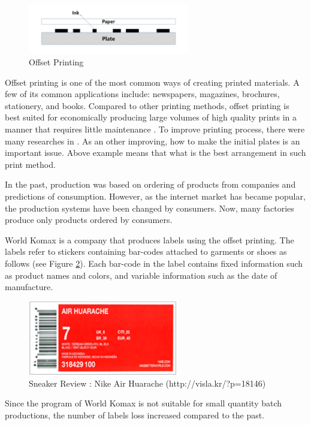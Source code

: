 \begin{figure}[h!]
	\centering
	\includegraphics[width=7cm]{OffsetPrint.pdf}
	\caption{Offset Printing}
	\label{fig:OffsetPrint}
\end{figure}

Offset printing is one of the most common ways of creating printed materials. A few of its common applications include: newspapers, magazines, brochures, stationery, and books. Compared to other printing methods, offset printing is best suited for economically producing large volumes of high quality prints in a manner that requires little maintenance \cite{Kipphan2001}. 
To improve printing process, there were many researches in \cite{AlChan, Muscle, Carmo}.
As an other improving, how to make the initial plates is an important issue. Above example means that what is the best arrangement in such print method.

In the past, production was based on ordering of products from companies and predictions of consumption. 
However, as the internet market has became popular, the production systems have been changed by consumers. 
Now, many factories produce only products ordered by consumers.

World Komax is a company that produces labels using the offset printing. The labels refer to stickers containing bar-codes attached to garments or shoes as follows (see Figure \ref{fig:AirHuarache}). Each bar-code in the label contains fixed information such as product names and colors, and variable information such as the date of manufacture.

\begin{figure}[h!]
	\centering
	\includegraphics[width=6.5cm]{AirHuarache.pdf}
	\caption{Sneaker Review : Nike Air Huarache (http://visla.kr/?p=18146)}
	\label{fig:AirHuarache}       %
\end{figure}

\noindent
Since the program of World Komax is not suitable for small quantity batch productions, the number of labels loss increased compared to the past.

